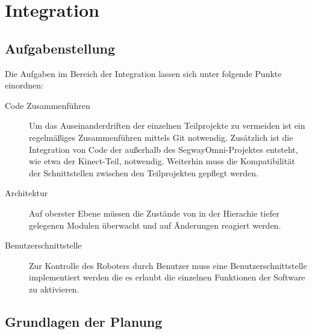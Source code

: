 
\chapter{Integration}
\label{integration_cha}
\authorsection{\editorjulian}

\section{Aufgabenstellung}
\label{aufgabenstellung_integration_sec}


Die Aufgaben im Bereich der Integration lassen sich unter folgende Punkte einordnen:

\begin{description}
\item[Code Zusammenführen]
Um das Auseinanderdriften der einzelnen Teilprojekte zu vermeiden ist ein regelmäßiges Zusammenführen mittels Git notwendig. Zusätzlich ist die Integration von Code der außerhalb des SegwayOmni-Projektes entsteht, wie etwa der Kinect-Teil, notwendig. Weiterhin muss die Kompatibilität der Schnittstellen zwischen den Teilprojekten gepflegt werden.

\item[Architektur]
Auf oberster Ebene müssen die Zustände von in der Hierachie tiefer gelegenen Modulen überwacht und auf Änderungen reagiert werden.

\item[Benutzerschnittstelle]
Zur Kontrolle des Roboters durch Benutzer muss eine Benutzerschnittstelle implementiert werden die es erlaubt die einzelnen Funktionen der Software zu aktivieren.

\end{description}

\section{Grundlagen der Planung}
\label{grundlagen_integration_sec}

